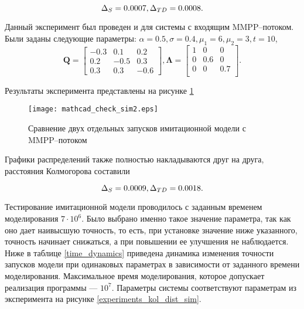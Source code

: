 \begin{equation*}
	\Delta_S = 0.0007,\\
	\Delta_{TD} = 0.0008.
\end{equation*}

Данный эксперимент был проведен и для системы с входящим MMPP--потоком. Были заданы следующие параметры: $\alpha = 0.5, \sigma = 0.4, \mu_{1} = 6, \mu_{2} = 3, t = 10 $,
\begin{equation*}
	\boldsymbol{Q}=\begin{bmatrix}
		-0.3 &  0.1 &  0.2\\
		0.2 & -0.5 &  0.3\\
		0.3 &  0.3 &  -0.6
	\end{bmatrix},
	\boldsymbol{\Lambda}=\begin{bmatrix}
		1 &	0 & 0\\
		0 &	0.6 & 0\\
		0 &	0 & 0.7\\
	\end{bmatrix}.
\end{equation*}

Результаты эксперимента представлены на рисунке \ref{experiments_kol_dist_sim2}

\begin{figure}[H]
	\centering
	\texttt{[image: mathcad\_check\_sim2.eps]}
	\caption{Сравнение двух отдельных запусков имитационной модели с MMPP--потоком}
	\label{experiments_kol_dist_sim2}
\end{figure} 

Графики распределений также полностью накладываются друг на друга, расстояния Колмогорова составили

\begin{equation*}
	\Delta_S = 0.0009,\\
	\Delta_{TD} = 0.0018.
\end{equation*}

Тестирование имитационной модели проводилось с заданным временем моделирования $7\cdot 10^6$. Было выбрано именно такое значение параметра, так как оно дает наивысшую точность, то есть, при установке значение ниже указанного, точность начинает снижаться, а при повышении ее улучшения не наблюдается. Ниже в таблице \ref{time_dynamics} приведена динамика изменения точности запусков модели при одинаковых параметрах в зависимости от заданного времени моделирования. Максимальное время моделирования, которое допускает реализация программы --- $10^7$. Параметры системы соответствуют параметрам из эксперимента на рисунке \ref{experiments_kol_dist_sim}.

